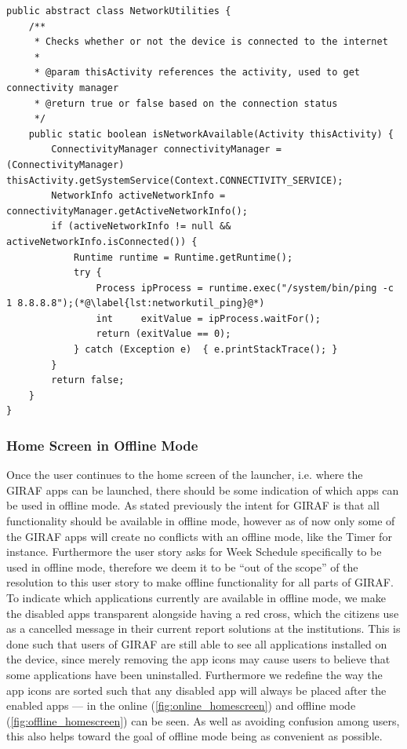 \begin{lstlisting}[float, floatplacement=h!, caption={The class from the \texttt{giraf-component} library where network utilities are implemented, such as the method used to check if a connection to the internet is available}, label={lst:networkutil}]
public abstract class NetworkUtilities {
    /**
     * Checks whether or not the device is connected to the internet
     *
     * @param thisActivity references the activity, used to get connectivity manager
     * @return true or false based on the connection status
     */
    public static boolean isNetworkAvailable(Activity thisActivity) {
        ConnectivityManager connectivityManager = (ConnectivityManager) thisActivity.getSystemService(Context.CONNECTIVITY_SERVICE);
        NetworkInfo activeNetworkInfo = connectivityManager.getActiveNetworkInfo();
        if (activeNetworkInfo != null && activeNetworkInfo.isConnected()) {
            Runtime runtime = Runtime.getRuntime();
            try {
                Process ipProcess = runtime.exec("/system/bin/ping -c 1 8.8.8.8");(*@\label{lst:networkutil_ping}@*)
                int     exitValue = ipProcess.waitFor();
                return (exitValue == 0);
            } catch (Exception e)  { e.printStackTrace(); }
        }
        return false;
    }
}
\end{lstlisting}

\subsubsection{Home Screen in Offline Mode}
Once the user continues to the home screen of the launcher, i.e. where the GIRAF apps can be launched, there should be some indication of which apps can be used in offline mode.
As stated previously the intent for GIRAF is that all functionality should be available in offline mode, however as of now only some of the GIRAF apps will create no conflicts with an offline mode, like the Timer for instance.
Furthermore the user story asks for Week Schedule specifically to be used in offline mode, therefore we deem it to be \enquote{out of the scope} of the resolution to this user story to make offline functionality for all parts of GIRAF.
To indicate which applications currently are available in offline mode, we make the disabled apps transparent alongside having a red cross, which the citizens use as a cancelled message in their current report solutions at the institutions.
This is done such that users of GIRAF are still able to see all applications installed on the device, since merely removing the app icons may cause users to believe that some applications have been uninstalled.
Furthermore we redefine the way the app icons are sorted such that any disabled app will always be placed after the enabled apps --- in  the online (\ref{fig:online_homescreen}) and offline mode (\ref{fig:offline_homescreen}) can be seen.
As well as avoiding confusion among users, this also helps toward the goal of offline mode being as convenient as possible.

